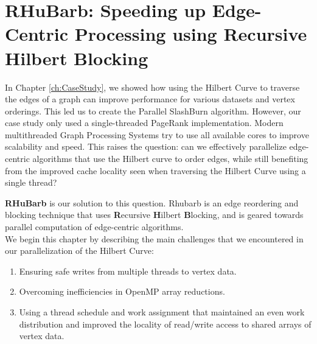 \chapter{RHuBarb: Speeding up Edge-Centric Processing using Recursive Hilbert Blocking}
\label{ch:Rhubarb}

    

In Chapter \ref{ch:CaseStudy}, we showed how using the Hilbert Curve to traverse the edges of a graph can improve performance for various datasets and vertex orderings. This led us to create the Parallel SlashBurn algorithm. However, our case study only used a single-threaded PageRank implementation. Modern multithreaded Graph Processing Systems try to use all available cores to improve scalability and speed. This raises the question: can we effectively parallelize edge-centric algorithms that use the Hilbert curve to order edges, while still benefiting from the improved cache locality seen when traversing the Hilbert Curve using a single thread?


\textbf{RHuBarb} is our solution to this question. Rhubarb is an edge reordering and blocking technique that uses \textbf{R}ecursive \textbf{H}ilbert \textbf{B}locking, and is geared towards parallel computation of edge-centric algorithms.\\
We begin this chapter by describing the main challenges that we encountered in our parallelization of the Hilbert Curve:
\begin{enumerate}
    \item Ensuring safe writes from multiple threads to vertex data.
        \item Overcoming inefficiencies in OpenMP \cite{openmp} array reductions.
    \item Using a thread schedule and work assignment that maintained an even work distribution and improved the locality of read/write access to shared arrays of vertex data.
\end{enumerate}


